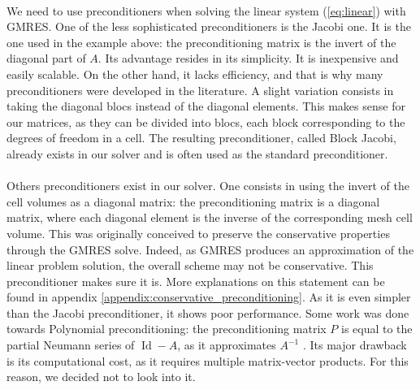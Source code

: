       \paragraph{}
      We need to use preconditioners when solving the linear system (\ref{eq:linear}) with GMRES.
      One of the less sophisticated preconditioners is the Jacobi one.
      It is the one used in the example above: the preconditioning matrix is the invert of the diagonal part of $A$.
      Its advantage resides in its simplicity.
      It is inexpensive and easily scalable.
      On the other hand, it lacks efficiency, and that is why many preconditioners were developed in the literature.
      A slight variation consists in taking the diagonal blocs instead of the diagonal elements.
      This makes sense for our matrices, as they can be divided into blocs, each block corresponding to the degrees of freedom in a cell.
      The resulting preconditioner, called Block Jacobi, already exists in our solver and is often used as the standard preconditioner.

      \paragraph{}
      Others preconditioners exist in our solver.
      One consists in using the invert of the cell volumes as a diagonal matrix: the preconditioning matrix is a diagonal matrix, where each diagonal element is the inverse of the corresponding mesh cell volume.
      This was originally conceived to preserve the conservative properties through the GMRES solve.
      Indeed, as GMRES produces an approximation of the linear problem solution, the overall scheme may not be conservative.
      This preconditioner makes sure it is.
      More explanations on this statement can be found in appendix \ref{appendix:conservative_preconditioning}.
      As it is even simpler than the Jacobi preconditioner, it shows poor performance.
      Some work was done towards Polynomial preconditioning: the preconditioning matrix $P$ is equal to the partial Neumann series of $\operatorname{Id} - A$, as it approximates $A^{-1}$ \cite{DuboisGreenbaumRodrigue1979}.
      Its major drawback is its computational cost, as it requires multiple matrix-vector products.
      For this reason, we decided not to look into it.

